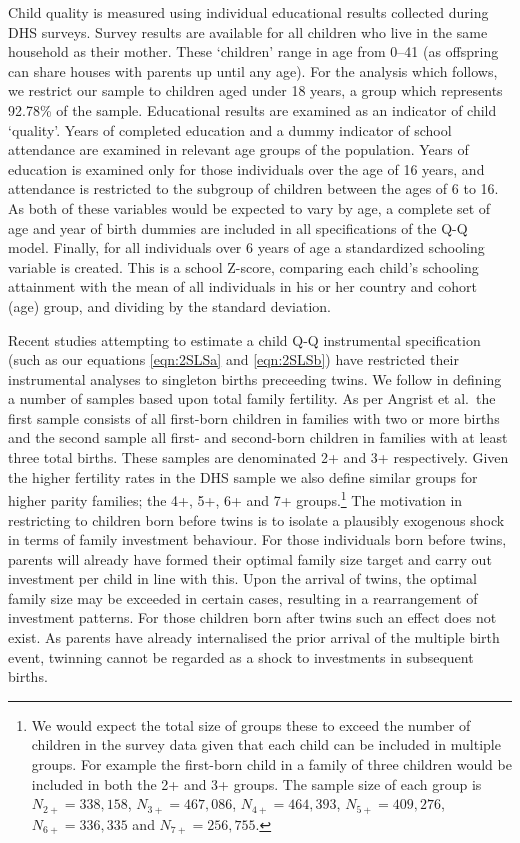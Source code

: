 \documentclass{article}[11pt,subeqn]
\begin{document}
\begin{spacing}{1.5}
Child quality is measured using individual educational results collected during DHS surveys.   Survey results are available for all children who live in the 
same household as their mother.  These `children' range in age from 0--41 (as offspring can share houses with parents up until any age).  For the analysis which
follows, we restrict our sample to children aged under 18 years, a group which represents 92.78\% of the sample.  Educational results are examined as an 
indicator of child `quality'.  Years of completed education and a dummy indicator of school attendance are examined in relevant age groups of the population.  
Years of education is examined only for those individuals over the age of 16 years, and attendance is restricted to the subgroup of children between the ages 
of 6 to 16.  As both of these variables would be expected to vary by age, a complete set of age and year of birth dummies are included in all specifications of 
the Q-Q model.  Finally, for all individuals over 6 years of age a standardized schooling variable is created.  This is a school Z-score, comparing each child's 
schooling attainment with the mean of all individuals in his or her country and cohort (age) group, and dividing by the standard deviation.  

Recent studies attempting to estimate a child Q-Q instrumental specification (such as our equations \ref{eqn:2SLSa} and \ref{eqn:2SLSb}) have restricted their 
instrumental analyses to singleton births preceeding twins.  We follow \citet{Angristetal2010} in defining a number of samples based upon total family fertility.  
As per Angrist et al.\ the first sample consists of all first-born children in families with two or more births and the second sample all first- and second-born 
children in families with at least three total births.  These samples are denominated 2+ and 3+ respectively.  Given the higher fertility rates in the DHS sample 
we also define similar groups for higher parity families; the 4+, 5+, 6+ and 7+ groups.\footnote{We would expect the total size of groups these to exceed the number 
of children in the survey data given that each child can be included in multiple groups.  For example the first-born child in a family of three children would be 
included in both the 2+ and 3+ groups.  The sample size of each group is $N_{2+}= 338,158$, $N_{3+}=467,086$, $N_{4+}= 464,393$, $N_{5+}=409,276$, $N_{6+}=336,335$ and 
$N_{7+}=256,755$.} %
The motivation in restricting to children born before twins is to isolate a plausibly exogenous shock in terms of family investment behaviour.  For those individuals 
born before twins, parents will already have formed their optimal family size target and carry out investment per child in line with this.  Upon the arrival of twins, 
the optimal family size may be exceeded in certain cases, resulting in a rearrangement of investment patterns.  For those children born after twins such an effect does 
not exist.  As parents have already internalised the prior arrival of the multiple birth event, twinning cannot be regarded as a shock to investments in subsequent 
births.


\end{spacing}
\end{document}
